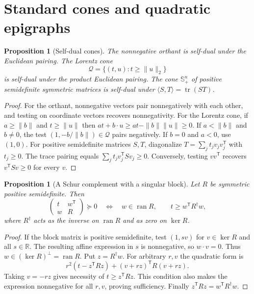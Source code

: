 \documentclass[11pt,oneside,openany]{book}
\newcommand{\R}{\mathbb R}
\theoremstyle{plain}
\newtheorem{proposition}[theorem]{Proposition}
\theoremstyle{definition}
\theoremstyle{remark}
\begin{document}
\section{Standard cones and quadratic epigraphs}
\label{v05-04}

\begin{proposition}[Self-dual cones]\label{prop:standard-self-dual-cones}
The nonnegative orthant is self-dual under the Euclidean
pairing. The Lorentz cone
\[
 \mathcal Q=\{(t,u):t\ge \|u\|_2\}
\]
is self-dual under the product Euclidean pairing.
The cone \(\mathbb S^n_+\) of positive semidefinite
symmetric matrices is self-dual under
\(\langle S,T\rangle=\operatorname{tr}(ST)\).
\end{proposition}

\begin{proof}
For the orthant, nonnegative vectors pair nonnegatively
with each other, and testing on coordinate vectors
recovers nonnegativity. For the Lorentz cone,
if \(a\ge\|b\|\) and \(t\ge\|u\|\) then
\(at+b\cdot u\ge at-\|b\|\|u\|\ge0\).
If \(a<\|b\|\) and \(b\ne0\), the test
\((1,-b/\|b\|)\in\mathcal Q\) pairs negatively.
If \(b=0\) and \(a<0\), use \((1,0)\).
For positive semidefinite matrices \(S,T\),
diagonalize \(T=\sum_j t_j v_j v_j^{\mathsf T}\)
with \(t_j\ge0\). The trace pairing equals
\(\sum_j t_j v_j^{\mathsf T}Sv_j\ge0\).
Conversely, testing \(vv^{\mathsf T}\) recovers
\(v^{\mathsf T}Sv\ge0\) for every \(v\).
\end{proof}

\begin{proposition}[A Schur complement with a singular block]\label{prop:singular-schur}
Let \(R\) be symmetric positive semidefinite. Then
\[
 \begin{pmatrix}t&w^{\mathsf T}\\w&R\end{pmatrix}\succeq0
 \quad\Longleftrightarrow\quad
 w\in\operatorname{ran}R,\qquad t\ge w^{\mathsf T}R^\dagger w ,
\]
where \(R^\dagger\) acts as the inverse on
\(\operatorname{ran}R\) and as zero on \(\ker R\).
\end{proposition}

\begin{proof}
If the block matrix is positive semidefinite, test
\((1,sv)\) for \(v\in\ker R\) and all \(s\in\R\).
The resulting affine expression in \(s\) is
nonnegative, so \(w\cdot v=0\).
Thus \(w\in(\ker R)^\perp=\operatorname{ran}R\).
Put \(z=R^\dagger w\). For arbitrary \(r,v\) the
quadratic form is
\[
 r^2(t-z^{\mathsf T}Rz)+(v+rz)^{\mathsf T}R(v+rz).
\]
Taking \(v=-rz\) gives necessity of \(t\ge z^{\mathsf T}Rz\).
This condition also makes the expression nonnegative
for all \(r,v\), proving sufficiency.
Finally \(z^{\mathsf T}Rz=w^{\mathsf T}R^\dagger w\).
\end{proof}
\end{document}
